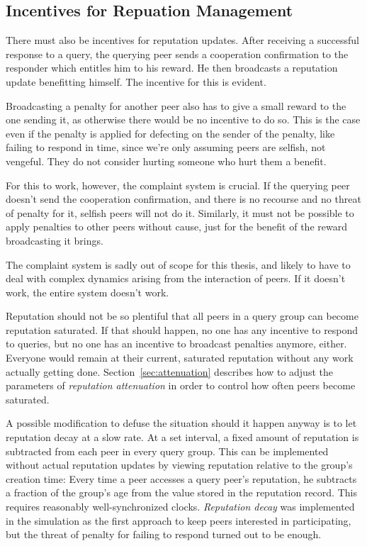 \subsection{Incentives for Repuation Management}
\label{sec:desc_incentives_rep_mgmt}
There must also be incentives for reputation updates. After receiving a
successful response to a query, the querying peer sends a cooperation
confirmation to the responder which entitles him to his reward. He then
broadcasts a reputation update benefitting himself. The incentive for this is
evident.

Broadcasting a penalty for another peer also has to give a small reward to the
one sending it, as otherwise there would be no incentive to do so. This is the
case even if the penalty is applied for defecting on the sender of the penalty,
like failing to respond in time, since we're only assuming peers are selfish,
not vengeful. They do not consider hurting someone who hurt them a benefit.

For this to work, however, the complaint system is crucial. If the querying peer
doesn't send the cooperation confirmation, and there is no recourse and no
threat of penalty for it, selfish peers will not do it. Similarly, it must not
be possible to apply penalties to other peers without cause, just for the
benefit of the reward broadcasting it brings.

The complaint system is sadly out of scope for this thesis, and likely to have
to deal with complex dynamics arising from the interaction of peers. If it
doesn't work, the entire system doesn't work.

Reputation should not be so plentiful that all peers in a query group can become
reputation saturated. If that should happen, no one has any incentive to respond
to queries, but no one has an incentive to broadcast penalties anymore, either.
Everyone would remain at their current, saturated reputation without any work
actually getting done. Section~\ref{sec:attenuation} describes how to adjust the
parameters of \emph{reputation attenuation} in order to control how often peers
become saturated.

A possible modification to defuse the situation should it happen anyway is to
let reputation decay at a slow rate. At a set interval, a fixed amount of
reputation is subtracted from each peer in every query group. This can be
implemented without actual reputation updates by viewing reputation relative to
the group's creation time: Every time a peer accesses a query peer's reputation,
he subtracts a fraction of the group's age from the value stored in the
reputation record. This requires reasonably well-synchronized clocks.
\emph{Reputation decay} was implemented in the simulation as the first approach
to keep peers interested in participating, but the threat of penalty for failing
to respond turned out to be enough.

